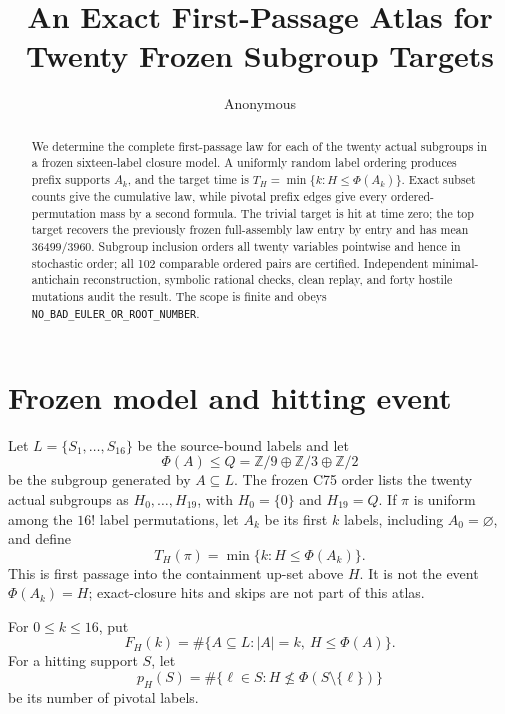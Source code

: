 \documentclass[10pt]{article}
\title{An Exact First-Passage Atlas for Twenty Frozen Subgroup Targets}
\author{Anonymous}
\date{}
\newcommand{\Phiop}{\Phi}
\newcommand{\Q}{Q}
\begin{document}
\maketitle

\begin{abstract}
We determine the complete first-passage law for each of the twenty actual
subgroups in a frozen sixteen-label closure model.  A uniformly random label
ordering produces prefix supports $A_k$, and the target time is
$T_H=\min\{k:H\leq\Phiop(A_k)\}$.  Exact subset counts give the cumulative
law, while pivotal prefix edges give every ordered-permutation mass by a
second formula.  The trivial target is hit at time zero; the top target
recovers the previously frozen full-assembly law entry by entry and has mean
$36499/3960$.  Subgroup inclusion orders all twenty variables pointwise and
hence in stochastic order; all 102 comparable ordered pairs are certified.
Independent minimal-antichain reconstruction, symbolic rational checks, clean
replay, and forty hostile mutations audit the result.  The scope is finite
and obeys \texttt{NO\_BAD\_EULER\_OR\_ROOT\_NUMBER}.
\end{abstract}

\section{Frozen model and hitting event}
Let $L=\{S_1,\ldots,S_{16}\}$ be the source-bound labels and let
\[
 \Phiop(A)\leq \Q=\mathbb Z/9\oplus\mathbb Z/3\oplus\mathbb Z/2
\]
be the subgroup generated by $A\subseteq L$.  The frozen C75 order lists the
twenty actual subgroups as $H_0,\ldots,H_{19}$, with $H_0=\{0\}$ and
$H_{19}=\Q$.  If $\pi$ is uniform among the $16!$ label permutations, let
$A_k$ be its first $k$ labels, including $A_0=\varnothing$, and define
\[
 T_H(\pi)=\min\{k:H\leq\Phiop(A_k)\}.
\]
This is first passage into the containment up-set above $H$.  It is not the
event $\Phiop(A_k)=H$; exact-closure hits and skips are not part of this atlas.

For $0\leq k\leq16$, put
\[
 F_H(k)=\#\{A\subseteq L:|A|=k,\ H\leq\Phiop(A)\}.
\]
For a hitting support $S$, let
\[
 p_H(S)=\#\{\ell\in S:H\not\leq\Phiop(S\setminus\{\ell\})\}
\]
be its number of pivotal labels.
\end{document}
